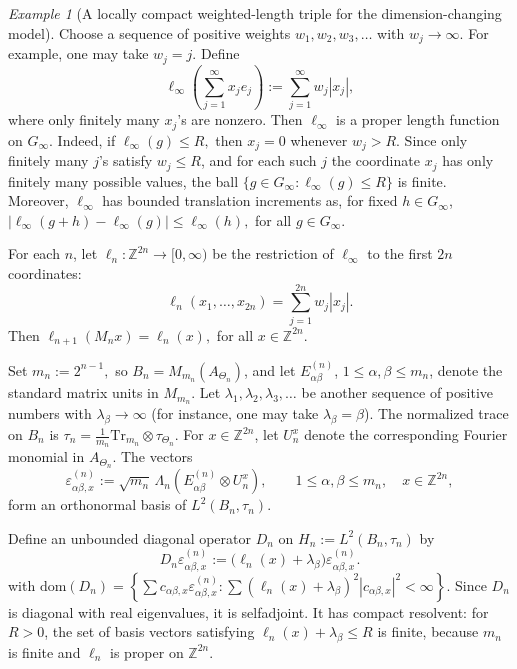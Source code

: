 \documentclass[11pt]{amsart}
\theoremstyle{definition}
\theoremstyle{remark}
\newtheorem{example}[theorem]{Example}
\newcommand{\Z}{\mathbb{Z}}
\newcommand{\Tr}{\mathrm{Tr}}
\newcommand{\dom}{\mathrm{dom}}
\begin{document}
\begin{example}[A locally compact weighted-length triple for the dimension-changing model]
Choose a sequence of positive weights $w_1,w_2,w_3,\ldots$
with $w_j\to\infty.$
For example, one may take $w_j=j$. Define
\[
\ell_\infty\left(\sum_{j=1}^\infty x_je_j\right)
:=
\sum_{j=1}^\infty w_j|x_j|,
\]
where only finitely many $x_j$'s are nonzero. Then $\ell_\infty$ is a
proper length function on $G_\infty$. Indeed, if $\ell_\infty(g)\leq R,$
then $x_j=0$ whenever $w_j>R$. Since only finitely many $j$'s satisfy
$w_j\leq R$, and for each such $j$ the coordinate $x_j$ has only finitely
many possible values, the ball $\{g\in G_\infty:\ell_\infty(g)\leq R\}$
is finite. Moreover, $\ell_\infty$ has bounded translation increments as, for fixed
$h\in G_\infty$, $|\ell_\infty(g+h)-\ell_\infty(g)|\leq\ell_\infty(h),$ for all
$g\in G_\infty.$

For each $n$, let $\ell_n\colon \Z^{2n}\to[0,\infty)$
be the restriction of $\ell_\infty$ to the first $2n$ coordinates:
\[
\ell_n(x_1,\ldots,x_{2n})
=
\sum_{j=1}^{2n}w_j|x_j|.
\]
Then
$\ell_{n+1}(M_nx)=\ell_n(x),$ for all $x\in\Z^{2n}.$

Set $m_n:=2^{n-1},$ so
$B_n=M_{m_n}(A_{\Theta_n})$, and 
let \(E_{\alpha\beta}^{(n)}\), \(1\leq\alpha,\beta\leq m_n\), denote the
standard matrix units in $M_{m_n}$. Let $\lambda_1,\lambda_2,\lambda_3,\ldots$
be another sequence of positive numbers with $\lambda_\beta\to\infty$ (for instance, one may take $\lambda_\beta=\beta$).
The normalized trace on $B_n$ is
$\tau_n=\frac{1}{m_n}\Tr_{m_n}\otimes\tau_{\Theta_n}.$
For $x\in\Z^{2n}$, let $U_n^x$ denote the corresponding Fourier monomial in
$A_{\Theta_n}$. The vectors
\[
\varepsilon_{\alpha\beta,x}^{(n)}
:=
\sqrt{m_n}\,
\Lambda_n(E_{\alpha\beta}^{(n)}\otimes U_n^x),
\qquad
1\leq\alpha,\beta\leq m_n,\quad x\in\Z^{2n},
\]
form an orthonormal basis of $L^2(B_n,\tau_n)$.

Define an unbounded diagonal operator $D_n$ on $H_n:=L^2(B_n,\tau_n)$
by
\[
D_n\varepsilon_{\alpha\beta,x}^{(n)}
:=
\bigl(\ell_n(x)+\lambda_\beta\bigr)
\varepsilon_{\alpha\beta,x}^{(n)}.
\]
with $\dom(D_n)
=
\left\{
\sum c_{\alpha\beta,x}\varepsilon_{\alpha\beta,x}^{(n)}:
\sum
(\ell_n(x)+\lambda_\beta)^2|c_{\alpha\beta,x}|^2<\infty
\right\}.$
Since $D_n$ is diagonal with real eigenvalues, it is selfadjoint. It has
compact resolvent: for $R>0$, the set of basis vectors satisfying $\ell_n(x)+\lambda_\beta\leq R$
is finite, because $m_n$ is finite and $\ell_n$ is proper on \(\Z^{2n}\).


\end{example}
\end{document}
